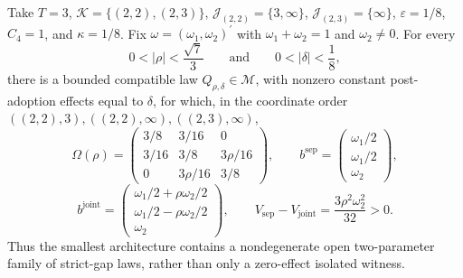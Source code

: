 Take \(T=3\), \(\mathcal K=\{(2,2),(2,3)\}\), \(\mathcal J_{(2,2)}=\{3,\infty\}\), \(\mathcal J_{(2,3)}=\{\infty\}\), \(\varepsilon=1/8\), \(C_4=1\), and \(\kappa=1/8\). Fix \(\omega=(\omega_1,\omega_2)^{\prime}\) with \(\omega_1+\omega_2=1\) and \(\omega_2\ne0\). For every
\[
0<|\rho|<\frac{\sqrt7}{3}
\qquad\text{and}\qquad
0<|\delta|<\frac18,
\]
there is a bounded compatible law \(Q_{\rho,\delta}\in\mathcal M\), with nonzero constant post-adoption effects equal to \(\delta\), for which, in the coordinate order \(((2,2),3),((2,2),\infty),((2,3),\infty)\),
\[
\Omega(\rho)=
\begin{pmatrix}
3/8&3/16&0\\
3/16&3/8&3\rho/16\\
0&3\rho/16&3/8
\end{pmatrix},
\qquad
b^{\mathrm{sep}}=
\begin{pmatrix}\omega_1/2\\ \omega_1/2\\ \omega_2\end{pmatrix},
\]
\[
b^{\mathrm{joint}}=
\begin{pmatrix}
\omega_1/2+\rho\omega_2/2\\
\omega_1/2-\rho\omega_2/2\\
\omega_2
\end{pmatrix},
\qquad
V_{\mathrm{sep}}-V_{\mathrm{joint}}
=\frac{3\rho^2\omega_2^2}{32}>0.
\]
Thus the smallest architecture contains a nondegenerate open two-parameter family of strict-gap laws, rather than only a zero-effect isolated witness.